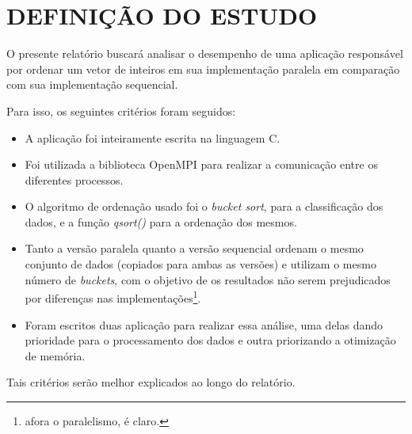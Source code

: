 \section{\normalsize DEFINIÇÃO DO ESTUDO}
	O presente relatório buscará analisar o desempenho de uma aplicação responsável por ordenar um vetor de inteiros em sua implementação paralela em comparação com sua implementação sequencial.
	
	Para isso, os seguintes critérios foram seguidos:
	\begin{itemize}
		\item A aplicação foi inteiramente escrita na linguagem C.
		\item Foi utilizada a biblioteca OpenMPI para realizar a comunicação entre os diferentes processos.
		\item O algoritmo de ordenação usado foi o \textit{bucket sort}, para a classificação dos dados, e a função \textit{qsort()} para a ordenação dos mesmos.
		\item Tanto a versão paralela quanto a versão sequencial ordenam o mesmo conjunto de dados (copiados para ambas as versões) e utilizam o mesmo número de \textit{buckets}, com o objetivo de os resultados não serem prejudicados por diferenças nas implementações\footnote{afora o paralelismo, é claro.}. 
		\item Foram escritos duas aplicação para realizar essa análise, uma delas dando prioridade para o processamento dos dados e outra priorizando a otimização de memória.
	\end{itemize}
	
	Tais critérios serão melhor explicados ao longo do relatório.